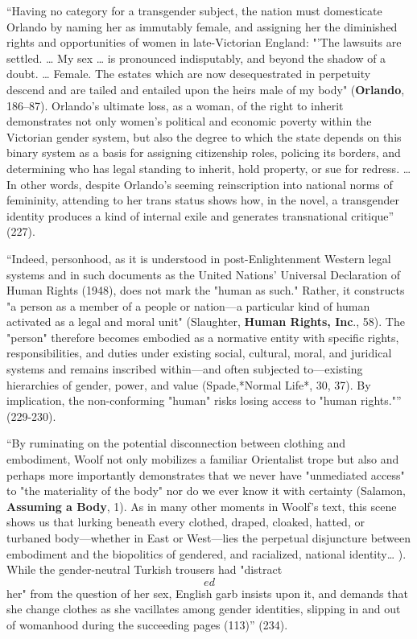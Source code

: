 \documentclass[11pt]{article}
\begin{document}
“Having no category for a transgender subject, the nation must
domesticate Orlando by naming her as immutably female, and assigning
her the diminished rights and opportunities of women in late-Victorian
England: "'The lawsuits are settled. … My sex … is pronounced
indisputably, and beyond the shadow of a doubt. … Female. The estates
which are now desequestrated in perpetuity descend and are tailed and
entailed upon the heirs male of my body" (\textbf{Orlando}, 186–87).
Orlando's ultimate loss, as a woman, of the right to inherit
demonstrates not only women's political and economic poverty within
the Victorian gender system, but also the degree to which the state
depends on this binary system as a basis for assigning citizenship
roles, policing its borders, and determining who has legal standing to
inherit, hold property, or sue for redress. … In other words, despite
Orlando's seeming reinscription into national norms of femininity,
attending to her trans status shows how, in the novel, a transgender
identity produces a kind of internal exile and generates transnational
critique” (227).

“Indeed, personhood, as it is understood in post-Enlightenment Western
legal systems and in such documents as the United Nations' Universal
Declaration of Human Rights (1948), does not mark the "human as such."
Rather, it constructs "a person as a member of a people or nation—a
particular kind of human activated as a legal and moral unit"
(Slaughter, \textbf{Human Rights, Inc}., 58). The "person" therefore becomes
embodied as a normative entity with specific rights, responsibilities,
and duties under existing social, cultural, moral, and juridical
systems and remains inscribed within—and often subjected to—existing
hierarchies of gender, power, and value (Spade,*Normal Life*, 30, 37).
By implication, the non-conforming "human" risks losing access to
"human rights."” (229-230).

“By ruminating on the potential disconnection between clothing and
embodiment, Woolf not only mobilizes a familiar Orientalist trope but
also and perhaps more importantly demonstrates that we never have
"unmediated access" to "the materiality of the body" nor do we ever
know it with certainty (Salamon, \textbf{Assuming a Body}, 1). As in many
other moments in Woolf's text, this scene shows us that lurking
beneath every clothed, draped, cloaked, hatted, or turbaned
body—whether in East or West—lies the perpetual disjuncture between
embodiment and the biopolitics of gendered, and racialized, national
identity… ). While the gender-neutral Turkish trousers had
"distract\[ed\] her" from the question of her sex, English garb
insists upon it, and demands that she change clothes as she vacillates
among gender identities, slipping in and out of womanhood during the
succeeding pages (113)” (234).
\end{document}
